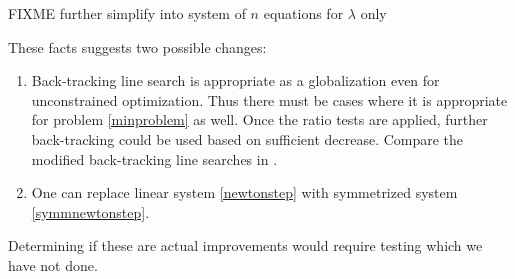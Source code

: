 \documentclass[11pt]{article}
\begin{document}
FIXME further simplify into system of $n$ equations for $\lambda$ only

These facts suggests two possible changes:
\begin{enumerate}
\item Back-tracking line search is appropriate as a globalization even for unconstrained optimization.  Thus there must be cases where it is appropriate for problem \eqref{minproblem} as well.  Once the ratio tests are applied, further back-tracking could be used based on sufficient decrease.  Compare the modified back-tracking line searches in \cite{BensonMunson2006}.
\item One can replace linear system \eqref{newtonstep} with symmetrized system \eqref{symmnewtonstep}.
\end{enumerate}
Determining if these are actual improvements would require testing which we have not done.



\medskip



\end{document}
